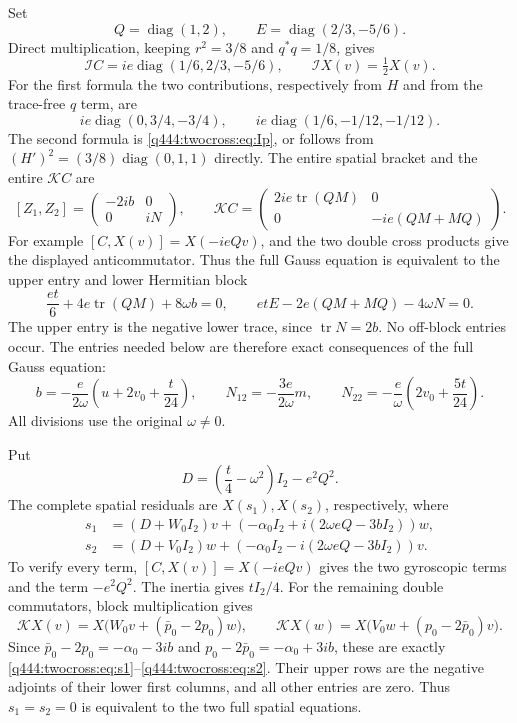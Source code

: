 Set
\[
Q=\operatorname{diag}(1,2),\qquad
E=\operatorname{diag}(2/3,-5/6).
\]
Direct multiplication, keeping $r^2=3/8$ and $q^*q=1/8$, gives
\begin{equation}
\mathcal IC=ie\operatorname{diag}(1/6,2/3,-5/6),\qquad
\mathcal IX(v)=\tfrac12X(v).
\label{q444:twocross:eq:inertia-classified}
\end{equation}
For the first formula the two contributions, respectively from $H$
and from the trace-free $q$ term, are
\[
 ie\operatorname{diag}(0,3/4,-3/4),\qquad
 ie\operatorname{diag}(1/6,-1/12,-1/12).
\]
The second formula is \eqref{q444:twocross:eq:Ip}, or follows from
$(H')^2=(3/8)\operatorname{diag}(0,1,1)$ directly.
The entire spatial bracket and the entire $\mathcal KC$ are
\[
[Z_1,Z_2]=\begin{pmatrix}-2ib&0\\0&iN\end{pmatrix},\qquad
\mathcal KC=\begin{pmatrix}2ie\operatorname{tr}(QM)&0\\
0&-ie(QM+MQ)\end{pmatrix}.
\]
For example $[C,X(v)]=X(-ieQv)$, and the two double cross products
give the displayed anticommutator. Thus the full Gauss equation is
equivalent to the upper entry and lower Hermitian block
\begin{equation}
\frac{et}{6}+4e\operatorname{tr}(QM)+8\omega b=0,\qquad
etE-2e(QM+MQ)-4\omega N=0.
\label{q444:twocross:eq:gauss-block}
\end{equation}
The upper entry is the negative lower trace, since
$\operatorname{tr}N=2b$. No off-block entries occur. The entries needed
below are therefore exact consequences of the full Gauss equation:
\begin{equation}
b=-\frac e{2\omega}\left(u+2v_0+\frac t{24}\right),\qquad
N_{12}=-\frac{3e}{2\omega}m,\qquad
N_{22}=-\frac e\omega\left(2v_0+\frac{5t}{24}\right).
\label{q444:twocross:eq:gauss-needed}
\end{equation}
All divisions use the original $\omega\ne0$.

Put
\[
D=\left(\frac t4-\omega^2\right)I_2-e^2Q^2.
\]
The complete spatial residuals are $X(s_1),X(s_2)$, respectively, where
\begin{align}
s_1&=(D+W_0I_2)v+
 \left(-\alpha_0I_2+i(2\omega eQ-3bI_2)\right)w,\label{q444:twocross:eq:s1}\\
s_2&=(D+V_0I_2)w+
 \left(-\alpha_0I_2-i(2\omega eQ-3bI_2)\right)v.\label{q444:twocross:eq:s2}
\end{align}
To verify every term, $[C,X(v)]=X(-ieQv)$ gives the two gyroscopic
terms and the term $-e^2Q^2$. The inertia gives $tI_2/4$.
For the remaining double commutators, block multiplication gives
\[
\mathcal KX(v)=X\bigl(W_0v+(\bar p_0-2p_0)w\bigr),\qquad
\mathcal KX(w)=X\bigl(V_0w+(p_0-2\bar p_0)v\bigr).
\]
Since $\bar p_0-2p_0=-\alpha_0-3ib$ and
$p_0-2\bar p_0=-\alpha_0+3ib$, these are exactly
\eqref{q444:twocross:eq:s1}--\eqref{q444:twocross:eq:s2}. Their upper rows are the negative
adjoints of their lower first columns, and all other entries are zero.
Thus $s_1=s_2=0$ is equivalent to the two full spatial equations.

